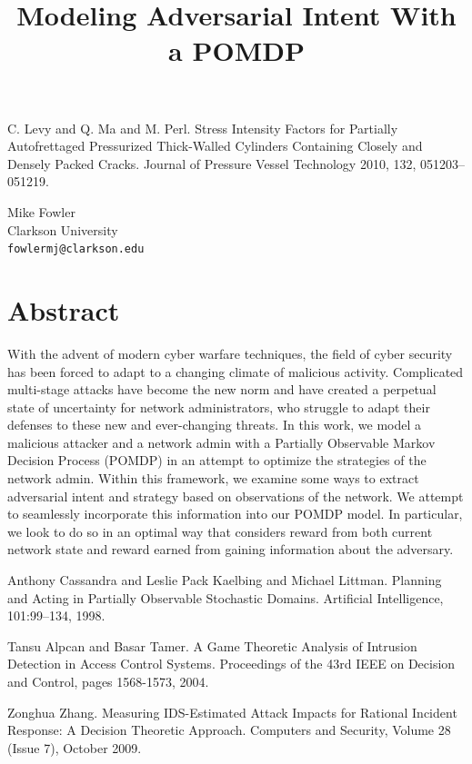 \documentclass[article,A4,11pt]{llncs}%
\begin{document}

\begin{thebibliography}{10}
{\sc C. Levy and Q. Ma and M. Perl}. {Stress Intensity Factors for Partially Autofrettaged Pressurized Thick-Walled Cylinders Containing Closely and Densely Packed Cracks}. Journal of Pressure Vessel Technology 2010, 132, 051203–051219.
\end{thebibliography}

\title{Modeling Adversarial Intent With a POMDP}
 \author{} \institute{}
\maketitle
\begin{center}
{\large Mike  Fowler}\\
Clarkson University\\
{\tt fowlermj@clarkson.edu}
\end{center}

\section*{Abstract}
With the advent of modern cyber warfare techniques, the field of cyber security has been forced to adapt to a changing climate of malicious activity. Complicated multi-stage attacks have become the new norm and have created a perpetual state of uncertainty for network administrators, who struggle to adapt their defenses to these new and ever-changing threats. In this work, we model a malicious attacker and a network admin with a Partially Observable Markov Decision Process (POMDP) in an attempt to optimize the strategies of the network admin.  Within this framework, we examine some ways to extract adversarial intent and strategy based on observations of the network.  We attempt to seamlessly incorporate this information into our POMDP model. In particular, we look to do so in an optimal way that considers reward from both current network state and reward earned from gaining information about the adversary.


\begin{thebibliography}{10}
{\sc Anthony Cassandra and Leslie Pack Kaelbing and Michael Littman}. {Planning and Acting in Partially Observable Stochastic Domains}. Artificial Intelligence, 101:99--134, 1998.

{\sc Tansu Alpcan and Basar Tamer}. {A Game Theoretic Analysis of Intrusion Detection in Access Control Systems}. Proceedings of the 43rd IEEE on Decision and Control, pages 1568-1573, 2004.

{\sc Zonghua Zhang}. {Measuring IDS-Estimated Attack Impacts for Rational Incident Response: A Decision Theoretic Approach}. Computers and Security, Volume 28 (Issue 7), October 2009.
\end{thebibliography}
\end{document}
